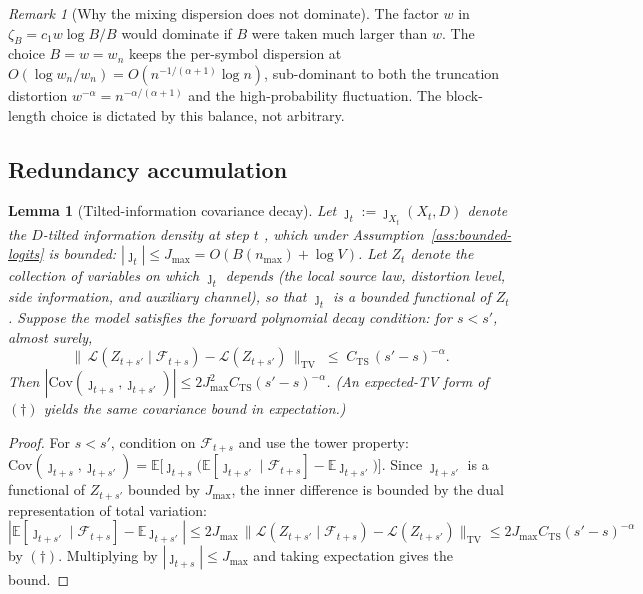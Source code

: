 \documentclass[11pt]{article}
\newcommand{\E}{\mathbb{E}}
\newcommand{\F}{\mathcal{F}}
\newcommand{\TV}{\mathrm{TV}}
\theoremstyle{plain}
\newtheorem{lemma}[theorem]{Lemma}
\theoremstyle{definition}
\theoremstyle{remark}
\newtheorem{remark}[theorem]{Remark}
\begin{document}
\begin{remark}[Why the mixing dispersion does not dominate]
The factor $w$ in $\zeta_B = c_1 w\log B/B$ would dominate if $B$
were taken much larger than $w$. The choice $B = w = w_n$ keeps the
per-symbol dispersion at $O(\log w_n / w_n) = O(n^{-1/(\alpha+1)}
\log n)$, sub-dominant to both the truncation distortion
$w^{-\alpha} = n^{-\alpha/(\alpha+1)}$ and the high-probability
fluctuation. The block-length choice is dictated by this balance,
not arbitrary.
\end{remark}

\subsection{Redundancy accumulation}

\begin{lemma}[Tilted-information covariance decay]
\label{lem:cov-decay}
Let $\jmath_t := \jmath_{X_t}(X_t, D)$ denote the $D$-tilted
information density at step $t$ \citep{kostina2012fixed}, which
under Assumption~\ref{ass:bounded-logits} is bounded:
$|\jmath_t| \leq J_{\max} = O(B(n_{\max}) + \log V)$. Let $Z_t$
denote the collection of variables on which $\jmath_t$ depends (the
local source law, distortion level, side information, and auxiliary
channel), so that $\jmath_t$ is a bounded functional of $Z_t$.
Suppose the model satisfies the \emph{forward} polynomial decay
condition: for $s < s'$, almost surely,
\[
\bigl\|\,\mathcal L(Z_{t+s'} \mid \F_{t+s})
   - \mathcal L(Z_{t+s'})\,\bigr\|_{\TV}
\;\leq\; C_{\mathrm{TS}}\,(s'-s)^{-\alpha}.
\tag{$\dagger$}
\]
Then $|\mathrm{Cov}(\jmath_{t+s}, \jmath_{t+s'})| \leq 2 J_{\max}^2
C_{\mathrm{TS}} (s'-s)^{-\alpha}$. (An expected-TV form of
$(\dagger)$ yields the same covariance bound in expectation.)
\end{lemma}

\begin{proof}
For $s < s'$, condition on $\F_{t+s}$ and use the tower property:
$\mathrm{Cov}(\jmath_{t+s}, \jmath_{t+s'}) = \E\bigl[\jmath_{t+s}
\bigl(\E[\jmath_{t+s'} \mid \F_{t+s}] - \E\jmath_{t+s'}\bigr)\bigr]$.
Since $\jmath_{t+s'}$ is a functional of $Z_{t+s'}$ bounded by
$J_{\max}$, the inner difference is bounded by the dual
representation of total variation:
$|\E[\jmath_{t+s'} \mid \F_{t+s}] - \E\jmath_{t+s'}| \leq 2 J_{\max}
\,\|\mathcal L(Z_{t+s'} \mid \F_{t+s}) - \mathcal L(Z_{t+s'})\|_{\TV}
\leq 2 J_{\max} C_{\mathrm{TS}}(s'-s)^{-\alpha}$ by $(\dagger)$.
Multiplying by $|\jmath_{t+s}| \leq J_{\max}$ and taking
expectation gives the bound.
\end{proof}
\end{document}
